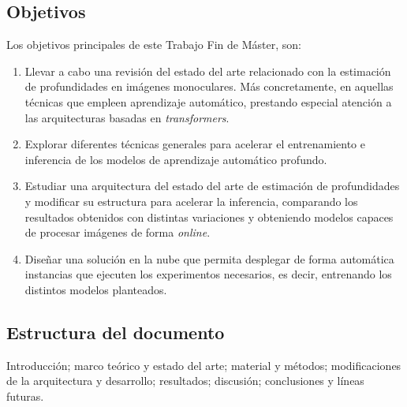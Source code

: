 \subsection{Objetivos}
Los objetivos principales de este Trabajo Fin de Máster, son:
\begin{enumerate}
	\item Llevar a cabo una revisión del estado del arte relacionado con la estimación de profundidades en imágenes monoculares. Más concretamente, en aquellas técnicas que empleen aprendizaje automático, prestando especial atención a las arquitecturas basadas en \textit{transformers}.
    \item Explorar diferentes técnicas generales para acelerar el entrenamiento e inferencia de los modelos de aprendizaje automático profundo. 
    \item Estudiar una arquitectura del estado del arte de estimación de profundidades y modificar su estructura para acelerar la inferencia, comparando los resultados obtenidos con distintas variaciones y obteniendo modelos capaces de procesar imágenes de forma \textit{online}.
    \item Diseñar una solución en la nube que permita desplegar de forma automática instancias que ejecuten los experimentos necesarios, es decir, entrenando los distintos modelos planteados.
\end{enumerate}


\subsection{Estructura del documento}
Introducción; marco teórico y estado del arte; material y métodos; modificaciones de la arquitectura y desarrollo; resultados; discusión; conclusiones y líneas futuras.

\clearpage
